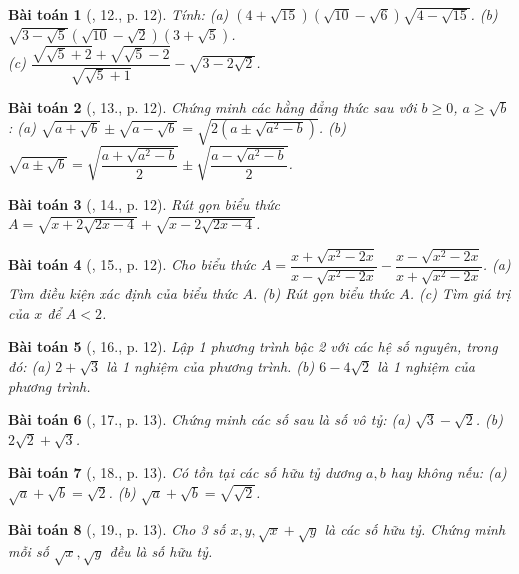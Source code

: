 \documentclass{article}
\newtheorem{baitoan}{Bài toán}
\begin{document}
\begin{baitoan}[\cite{Binh_Toan_9_tap_1}, 12., p. 12]
	Tính: (a) $(4 + \sqrt{15})(\sqrt{10} - \sqrt{6})\sqrt{4 - \sqrt{15}}$. (b) $\sqrt{3 - \sqrt{5}}(\sqrt{10} - \sqrt{2})(3 + \sqrt{5})$.\\(c) $\dfrac{\sqrt{\sqrt{5} + 2} + \sqrt{\sqrt{5} - 2}}{\sqrt{\sqrt{5} + 1}} - \sqrt{3 - 2\sqrt{2}}$.
\end{baitoan}

\begin{baitoan}[\cite{Binh_Toan_9_tap_1}, 13., p. 12]
	Chứng minh các hằng đẳng thức sau với $b\ge0$, $a\ge\sqrt{b}$: (a) $\sqrt{a + \sqrt{b}}\pm\sqrt{a - \sqrt{b}} = \sqrt{2(a\pm\sqrt{a^2 - b})}$. (b) $\sqrt{a\pm\sqrt{b}} = \sqrt{\dfrac{a + \sqrt{a^2 - b}}{2}}\pm\sqrt{\dfrac{a - \sqrt{a^2 - b}}{2}}$.
\end{baitoan}

\begin{baitoan}[\cite{Binh_Toan_9_tap_1}, 14., p. 12]
	Rút gọn biểu thức $A = \sqrt{x + 2\sqrt{2x - 4}} + \sqrt{x - 2\sqrt{2x - 4}}$.
\end{baitoan}

\begin{baitoan}[\cite{Binh_Toan_9_tap_1}, 15., p. 12]
	Cho biểu thức $A = \dfrac{x + \sqrt{x^2 - 2x}}{x - \sqrt{x^2 - 2x}} - \dfrac{x - \sqrt{x^2 - 2x}}{x + \sqrt{x^2 - 2x}}$. (a) Tìm điều kiện xác định của biểu thức $A$. (b) Rút gọn biểu thức $A$. (c) Tìm giá trị của $x$ để $A < 2$.
\end{baitoan}

\begin{baitoan}[\cite{Binh_Toan_9_tap_1}, 16., p. 12]
	Lập 1 phương trình bậc 2 với các hệ số nguyên, trong đó: (a) $2 + \sqrt{3}$ là 1 nghiệm của phương trình. (b) $6 - 4\sqrt{2}$ là 1 nghiệm của phương trình.
\end{baitoan}

\begin{baitoan}[\cite{Binh_Toan_9_tap_1}, 17., p. 13]
	Chứng minh các số sau là số vô tỷ: (a) $\sqrt{3} - \sqrt{2}$. (b) $2\sqrt{2} + \sqrt{3}$.
\end{baitoan}

\begin{baitoan}[\cite{Binh_Toan_9_tap_1}, 18., p. 13]
	Có tồn tại các số hữu tỷ dương $a,b$ hay không nếu: (a) $\sqrt{a} + \sqrt{b} = \sqrt{2}$. (b) $\sqrt{a} + \sqrt{b} = \sqrt{\sqrt{2}}$.
\end{baitoan}

\begin{baitoan}[\cite{Binh_Toan_9_tap_1}, 19., p. 13]
	Cho 3 số $x,y,\sqrt{x} + \sqrt{y}$ là các số hữu tỷ. Chứng minh mỗi số $\sqrt{x},\sqrt{y}$ đều là số hữu tỷ.
\end{baitoan}
\end{document}
